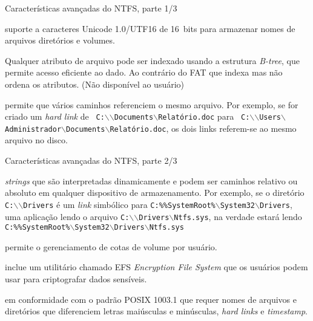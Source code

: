 \begin{frame}{Características avançadas do NTFS, parte 1/3}
  \footnotesize
  \begin{description}
  \item<1>[Unicode:]  suporte a caracteres Unicode 1.0/UTF16 de 16~bits para armazenar 
    nomes de arquivos diretórios e volumes.
  \item<2>[Indexação:] Qualquer atributo de arquivo pode ser indexado
    usando a estrutura {\em B-tree}, que permite acesso eficiente ao
    dado. Ao contrário do FAT que indexa mas não ordena os atributos.
    (Não disponível ao usuário)
  \item<3>[{\em Hard link}:] permite que vários caminhos referenciem o
    mesmo arquivo. Por exemplo, se for criado um {\em hard link} de
    {\tt
      C:$\backslash$$\backslash$Documents$\backslash$Relatório.doc}
    para {\tt
      C:$\backslash$$\backslash$Users$\backslash$Administrador$\backslash$Documents$\backslash$Relatório.doc},
    os dois links referem-se ao mesmo arquivo no disco.
  \end{description}
\end{frame}

\begin{frame}{Características avançadas do NTFS, parte 2/3}
  \footnotesize
  \begin{description}
  \item<1>[{\em Link} simbólico:] {\em strings} que são interpretadas
    dinamicamente e podem ser caminhos relativo ou absoluto em
    qualquer dispositivo de armazenamento. Por exemplo, se o diretório 
    {\tt C:$\backslash$$\backslash$Drivers} é um {\em link} simbólico 
    para
    {\tt C:\%\%SystemRoot\%$\backslash$System32$\backslash$Drivers}, uma 
    aplicação lendo o arquivo {\tt C:$\backslash$$\backslash$Drivers$\backslash$Ntfs.sys}, 
    na verdade estará lendo {\tt C:\%\%SystemRoot\%$\backslash$System32$\backslash$Drivers$\backslash$Ntfs.sys}
  \item<2>[Cota:] permite o gerenciamento de cotas de volume por usuário.
  \item<3>[Criptografia:] inclue um utilitário chamado EFS {\em
      Encryption File System} que os usuários podem usar para
    criptografar dados sensíveis.
  \item<4>[Suporte ao POSIX:] em conformidade com o padrão POSIX 1003.1 que requer 
    nomes de arquivos e diretórios que diferenciem letras maiúsculas e minúsculas, 
    {\em hard links} e {\em timestamp}.
  \end{description}
\end{frame}

